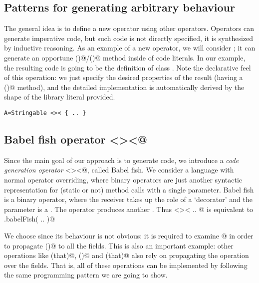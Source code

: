 \subsection*{Patterns for generating arbitrary behaviour}
The general idea is to define a new operator
using other operators.
Operators can generate imperative code, but such code is not directly
specified, it is synthesized by inductive reasoning.
As an example of a new operator, we will
consider \Q@Stringable@;
it can generate an opportune \Q@toS()@/\Q@toString()@ method inside of code literals.
In our example, the resulting code is going to be the definition
of class \Q@A@.
Note the declarative feel of this operation: we just specify the desired properties of the result (having a \Q@toS()@ method), and the detailed implementation is  
 automatically derived by the shape of the library literal provided.

\begin{lstlisting}
A=Stringable <>< { .. }
\end{lstlisting}

\subsection*{Babel fish operator \Q@<><@}
Since the main goal of our approach is to generate code, we introduce a \emph{code generation operator} \Q@<><@, called Babel fish.
We consider a language with normal operator overriding, where binary operators are just another syntactic representation for (static or not) method calls with a single parameter.
Babel fish is a binary operator, where the receiver takes up the role
of a `decorator' and the parameter is a \Q@Library@. The operator produces another \Q@Library@.
Thus \Q@Stringable <>< { .. }@ is equivalent to \Q@Stringable.babelFish({ .. })@ 




We choose \Q@Stringable@ since its behaviour is not obvious: it is required to examine @ in order to 
propagate \Q@toS()@ to all the fields.
This is also an important example: other operations like \Q@equals(that)@, \Q@hashCode()@ and \Q@compare(that)@
also rely on propagating the operation over the fields.
That is, all of these operations can be implemented by
following the same programming pattern we are going to show.

